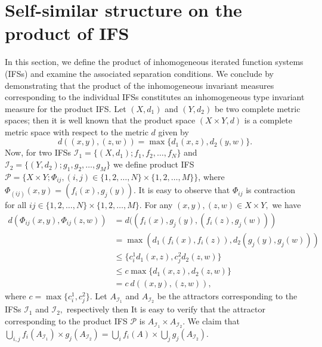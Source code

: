 \documentclass[12pt,oneside,reqno]{amsart}
\theoremstyle{definition}
\theoremstyle{remark}
\begin{document}
\section{Self-similar structure on the product of IFS}
In this section, we define the product of inhomogeneous iterated function systems (IFSs) and examine the associated separation conditions. We conclude by demonstrating that the product of the inhomogeneous invariant measures corresponding to the individual IFSs constitutes an inhomogeneous type invariant measure for the product IFS.
Let $(X,d_1)$ and $(Y,d_2)$ be two complete metric spaces; then it is well known that the product space $(X \times Y,d)$ is a complete metric space with respect to the metric $d$ given by
$$d((x,y),(z,w))= \max\{d_1(x,z),d_2(y,w)\}.$$
Now, for two IFSs
$\mathcal{I}_1= \{(X,d_1); f_1,f_2,\ldots,f_N\}$ and $\mathcal{I}_2= \{(Y,d_2); g_1,g_2,\ldots,g_M\}$ we define product IFS $\mathcal{P}= \{X \times Y; \Phi_{ij}, (i,j) \in \{1,2,\ldots,N\}\times \{1,2,\ldots,M\}\}$, where $\Phi_{(ij)}(x,y) = (f_i(x),g_j(y)).$ 
It is easy to observe that $\Phi_{ij}$ is contraction for all $ij \in \{1,2,\ldots,N\}\times \{1,2,\ldots,M\}.$
For any $(x,y),(z,w) \in X \times Y,$ we have 
\begin{equation*}
    \begin{aligned}
        d(\Phi_{ij}(x,y),\Phi_{ij}(z,w)) &= d((f_i(x),g_j(y),(f_i(z),g_j(w))) \\& = \max(d_1(f_i(x),f_i(z)),d_2(g_j(y),g_j(w))) \\& \le \{c^1_i d_1(x,z), c^2_j d_2(z,w)\} \\& \le c \max\{d_1(x,z), d_2(z,w)\} \\&= c~d((x,y),(z,w)),
    \end{aligned}
\end{equation*}
where $c= \max\{c^1_i,c^2_j\}.$ Let $A_{\mathcal{I}_1}$ and $A_{\mathcal{I}_2}$ be the attractors corresponding to the IFSs ${\mathcal{I}_1}$ and ${\mathcal{I}_2},$ respectively then
 It is easy to verify that the attractor corresponding to the product IFS $\mathcal{P}$ is $A_{\mathcal{I}_1} \times A_{\mathcal{I}_2}.$
 We claim that $\bigcup_{i,j} f_i(A_{\mathcal{I}_1}) \times g_j(A_{\mathcal{I}_2}) = \bigcup_{i} f_i(A) \times \bigcup_{j} g_j(A_{\mathcal{I}_2}).$
 
\end{document}
